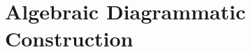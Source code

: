 \section{Algebraic Diagrammatic Construction}

\begin{figure}[h]
  \centering
  
  \caption{}
  \label{}
\end{figure}
